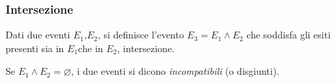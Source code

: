 \documentclass{subfiles}
\begin{document}
\subsubsection{Intersezione}
Dati due eventi \(E_{1} \text{,} E_{2}\), si definisce l'evento \(E_{3} = E_{1} \land E_{2}\) che soddisfa gli esiti presenti sia in \(E_{1} \text{che in } E_{2}\), intersezione.

\begin{Note*}
    Se \(E_{1} \land E_{2} = \varnothing\), i due eventi si dicono \emph{incompatibili} (o disgiunti).
\end{Note*}

\clearpage
\end{document}
